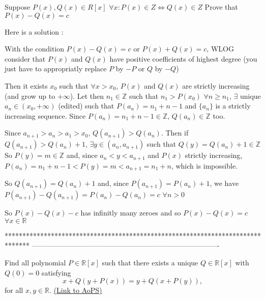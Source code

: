 \begin{solution}
	\begin{tcolorbox}Suppose  $ P(x),Q(x)\in R[x]$
$ \forall x : P(x)\in Z\Leftrightarrow Q(x)\in Z$
Prove that $ P(x)-Q(x) = c$\end{tcolorbox}

Here is a solution :

With the condition $ P(x)-Q(x) = c$ or $ P(x)+Q(x) = c$, WLOG consider  that $ P(x)$ and $ Q(x)$ have positive coefficients of highest degree (you just have to appropriatly replace $ P$ by $ -P$ or $ Q$ by $ -Q$)

Then it exists $ x_{0}$ such that $ \forall x > x_{0}$, $ P(x)$ and $ Q(x)$ are strictly increasing (and grow up to $ +\infty$).
Let then $ n_{1}\in\mathbb{Z}$ such that $ n_{1}> P(x_{0})$
$ \forall n\geq n_{1}$, $ \exists$ unique $ a_{n}\in(x_{0},+\infty)$ (edited) such that $ P(a_{n}) = n_{1}+n-1$ and $ \{a_{n}\}$ is a strictly increasing sequence.
Since $ P(a_{n}) = n_{1}+n-1\in\mathbb{Z}$, $ Q(a_{n})\in\mathbb{Z}$ too.

Since $ a_{n+1}> a_{n}> a_{1}> x_{0}$, $ Q(a_{n+1}) > Q(a_{n})$. Then if $ Q(a_{n+1}) > Q(a_{n})+1$, $ \exists y\in(a_{n},a_{n+1})$ such that $ Q(y) = Q(a_{n})+1\in\mathbb{Z}$
So $ P(y) = m\in\mathbb{Z}$ and, since $ a_{n}< y < a_{n+1}$ and $ P(x)$ strictly increasing, $ P(a_{n}) = n_{1}+n-1 < P(y) = m < a_{n+1}= n_{1}+n$, which is impossible.

So $ Q(a_{n+1}) = Q(a_{n})+1$ and, since $ P(a_{n+1}) = P(a_{n})+1$, we have $ P(a_{n+1})-Q(a_{n+1}) = P(a_{n})-Q(a_{n}) = c$ $ \forall n > 0$

So $ P(x)-Q(x)-c$ has infinitly many zeroes and so $ P(x)-Q(x) = c$ $ \forall x\in\mathbb{R}$
\end{solution}
*******************************************************************************
-------------------------------------------------------------------------------

\begin{problem}
	Find all polynomial $ P \in\mathbb R[x]$ such that there exists a unique $Q \in \mathbb R[x]$ with $Q(0)=0$ satisfying
\[x+Q(y+P(x)) = y+Q(x+P(y)),\]
for all $x,y \in \mathbb R$.
	\flushright \href{https://artofproblemsolving.com/community/c6h166605}{(Link to AoPS)}
\end{problem}



